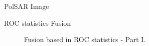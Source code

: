 \documentclass[10pt]{beamer}
\begin{document}
\begin{frame}[fragile]{PolSAR Image}
\begin{alertblock}{ROC statistics Fusion}
\begin{itemize}
\begin{figure}[htb!]
	\caption{Fusion based in ROC statistics - Part I.}
\label{fig8}
\end{figure}
\end{itemize}
\end{alertblock}
\end{frame}
\end{document}
